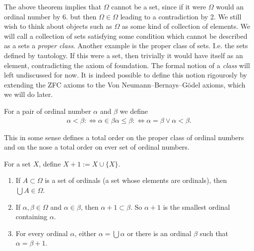 \begin{remark}
    The above theorem implies that $\Omega$ cannot be a set, since if it were $\Omega$ would an ordinal number by 6. but then $\Omega\in \Omega$ leading to a contradiction by 2. We still wish to think about objects such as $\Omega$ as some kind of collection of elements. We will call a collection of sets satisfying some condition which cannot be described as a sets a \textit{proper class}. Another example is the proper class of sets. I.e. the sets defined by tautology. If this were a set, then trivially it would have itself as an element, contradicting the axiom of foundation. The formal notion of a \textit{class} will left undiscussed for now. It is indeed possible to define this notion rigourosly by extending the ZFC axioms to the Von Neumann–Bernays–Gödel axioms, which we will do later. 
\end{remark}
\begin{definition}
    For a pair of ordinal number $\alpha$ and $\beta$ we define 
    \begin{gather*}
        \alpha <\beta :\iff \alpha \in \beta
        \alpha \leq \beta :\iff \alpha = \beta \vee \alpha <\beta.
    \end{gather*}
\end{definition}
\begin{remark}
    This in some sense defines a total order on the proper class of ordinal numbers and on the nose a total order on ever set of ordinal numbers. 
\end{remark}
\begin{definition}
    For a set $X$, define $X+1:= X\cup\{X\}$.
\end{definition}
\begin{corollary}
    \begin{enumerate}
        \item If $A\subset \Omega$ is a set of ordinals (a set whose elements are ordinals), then $\bigcup A \in \Omega$.  
        \item If $\alpha,\beta\in \Omega$ and $\alpha\in \beta$, then $\alpha+1\subset \beta$. So $\alpha+1$ is the smallest ordinal containing $\alpha$. 
        \item For every ordinal $\alpha$, either $\alpha = \bigcup \alpha$ or there is an ordinal $\beta$ such that $\alpha = \beta+1$.
    \end{enumerate}
\end{corollary}
